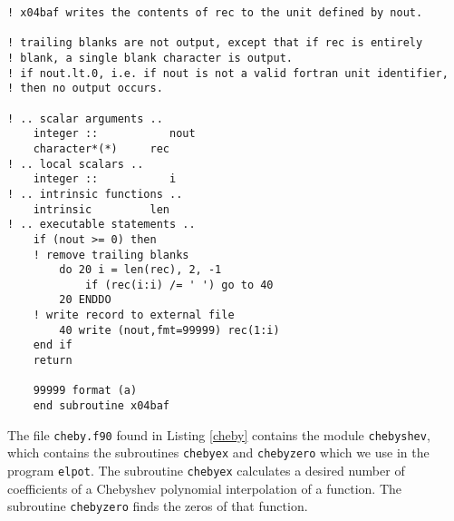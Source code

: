 \documentclass[12pt]{article}
\begin{document}
\begin{lstlisting}[frame=single,caption={{\tt d01b.f90}},label=d01b]
! x04baf writes the contents of rec to the unit defined by nout.

! trailing blanks are not output, except that if rec is entirely
! blank, a single blank character is output.
! if nout.lt.0, i.e. if nout is not a valid fortran unit identifier,
! then no output occurs.

! .. scalar arguments ..
    integer ::           nout
    character*(*)     rec
! .. local scalars ..
    integer ::           i
! .. intrinsic functions ..
    intrinsic         len
! .. executable statements ..
    if (nout >= 0) then
    ! remove trailing blanks
        do 20 i = len(rec), 2, -1
            if (rec(i:i) /= ' ') go to 40
        20 ENDDO
    ! write record to external file
        40 write (nout,fmt=99999) rec(1:i)
    end if
    return

    99999 format (a)
    end subroutine x04baf

\end{lstlisting}

The file {\tt cheby.f90} found in Listing \ref{cheby} contains the module {\tt chebyshev}, which contains the subroutines {\tt chebyex} and {\tt chebyzero} which we use in the program {\tt elpot}.  The subroutine {\tt chebyex} calculates a desired number of coefficients of a Chebyshev polynomial interpolation of a function.  The subroutine {\tt chebyzero} finds the zeros of that function.
\end{document}
